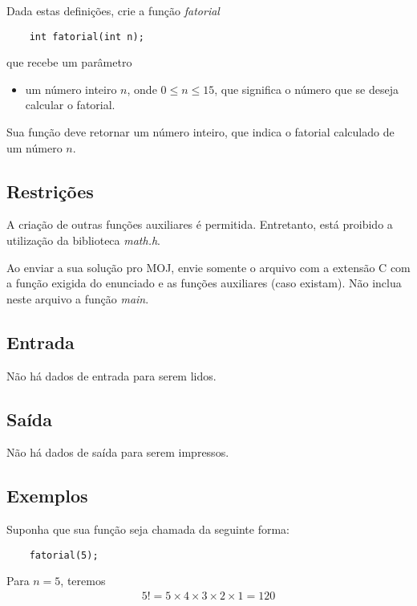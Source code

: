Dada estas definições, crie a função \emph{fatorial}

\begin{lstlisting}
	int fatorial(int n);
\end{lstlisting}

que recebe um parâmetro
\begin{itemize}
	\item um número inteiro $n$, onde $0 \leq n \leq 15$, que significa o número que se deseja calcular o fatorial.
\end{itemize}

Sua função deve retornar um número inteiro, que indica o fatorial calculado de um número $n$.

\subsection*{Restrições}

 A criação de outras funções auxiliares é permitida. Entretanto, está proibido a utilização da biblioteca \textit{math.h}.

 Ao enviar a sua solução pro MOJ, envie somente o arquivo com a extensão C com a função exigida do enunciado e as funções auxiliares (caso existam). Não inclua neste arquivo a função \textit{main}.

\subsection*{Entrada}

Não há dados de entrada para serem lidos.

\subsection*{Saída}

Não há dados de saída para serem impressos.

\subsection*{Exemplos}


Suponha que sua função seja chamada da seguinte forma:

\begin{lstlisting}
	fatorial(5);
\end{lstlisting}

Para $n = 5$, teremos
\begin{equation*}
	\begin{matrix}
		5! = 5 \times 4 \times 3 \times 2 \times 1 = 120
	\end{matrix}
\end{equation*}

